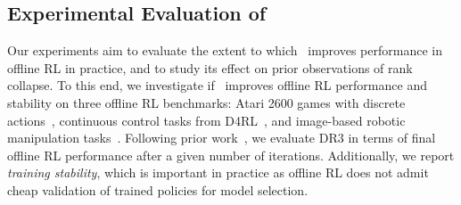 

\vspace{-0.2cm}
\subsection{Experimental Evaluation of \drmethodname}
\label{sec:experiments}
\vspace{-0.2cm}
Our experiments aim to evaluate the extent to which \drmethodname\ improves performance in offline RL in practice, and to study its effect on prior observations of rank collapse. To this end, we investigate if \drmethodname\ improves offline RL performance and stability on three offline RL benchmarks: Atari 2600 games with discrete actions~\citep{agarwal2019optimistic}, continuous control tasks from D4RL~\citep{fu2020d4rl}, and image-based robotic manipulation tasks~\citep{singh2020cog}.
Following prior work~\citep{fu2020d4rl, gulcehre2020rl}, we evaluate DR3 in terms of final offline RL performance after a given number of iterations. Additionally, we report \emph{training stability}, which is important in practice as offline RL does not admit cheap validation of trained policies for model selection.
